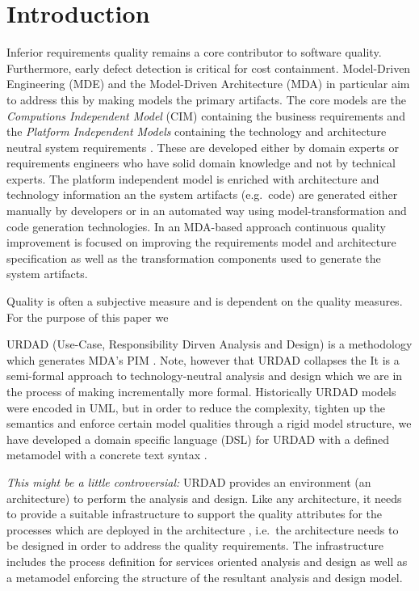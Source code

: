 \section{Introduction}\label{sec:Introduction}

Inferior requirements quality remains a core contributor to software quality\cite{heck_experiences_2008,_strategies_2011}. Furthermore, early defect detection is critical for cost containment\cite{betterRefernceThanBoehm1981WhichReliesOnWaterfall}. Model-Driven Engineering (MDE) and the Model-Driven Architecture (MDA) in particular aim to address this by making models the primary artifacts. The core models are the \emph{Computions Independent Model} (CIM) containing the business requirements and the \emph{Platform Independent Models} containing the technology and architecture neutral system requirements \cite{needAGoodCitation}. These are developed either by domain experts or requirements engineers who have solid domain knowledge and not by technical experts. The platform independent model is enriched with architecture and technology information an the system artifacts (e.g.\ code) are generated either manually by developers or in an automated way using model-transformation and code generation technologies. In an MDA-based approach continuous quality improvement is focused on improving the requirements model and architecture specification as well as the transformation components used to generate the system artifacts.

Quality is often a subjective measure and is dependent on the quality measures. For the purpose of this paper we 

URDAD (Use-Case, Responsibility Dirven Analysis and Design) \cite{solms_technology_2007} is a methodology which generates MDA's PIM \cite{solms_generating_2009}. Note, however that URDAD collapses the It is a semi-formal \cite{solms_urdad_2010} approach to technology-neutral analysis and design which we are in the process of making incrementally more formal. Historically URDAD models were encoded in UML, but in order to reduce the complexity, tighten up the semantics and enforce certain model qualities through a rigid model structure, we have developed a domain specific language (DSL) for URDAD with a defined metamodel with a concrete text syntax \cite{solmsfritz_domain-specific_????}.

\emph{This might be a little controversial:} URDAD provides an environment (an architecture) to perform the analysis and design. Like any architecture, it needs to provide a suitable infrastructure to support the quality attributes for the processes which are deployed in the architecture \cite{}, i.e.\ the architecture needs to be designed in order to address the quality requirements. The infrastructure includes the process definition for services oriented analysis and design as well as a metamodel enforcing the structure of the resultant analysis and design model.


